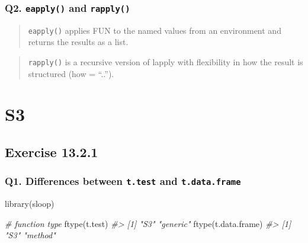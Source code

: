 \documentclass[
]{book}
\newenvironment{Shaded}{\begin{snugshade}}{\end{snugshade}}
\newcommand{\CommentTok}[1]{\textcolor[rgb]{0.56,0.35,0.01}{\textit{#1}}}
\newcommand{\FunctionTok}[1]{\textcolor[rgb]{0.00,0.00,0.00}{#1}}
\newcommand{\NormalTok}[1]{#1}
\begin{document}
\hypertarget{q2.-eapply-and-rapply}{%
\subsection*{\texorpdfstring{Q2. \texttt{eapply()} and \texttt{rapply()}}{Q2. eapply() and rapply()}}\label{q2.-eapply-and-rapply}}

\begin{quote}
\texttt{eapply()} applies FUN to the named values from an environment and returns the results as a list.
\end{quote}

\begin{quote}
\texttt{rapply()} is a recursive version of lapply with flexibility in how the result is structured (how = ``..'').
\end{quote}

\hypertarget{s3}{%
\chapter{S3}\label{s3}}

\hypertarget{exercise-13.2.1}{%
\section{Exercise 13.2.1}\label{exercise-13.2.1}}

\hypertarget{q1.-differences-between-t.test-and-t.data.frame}{%
\subsection*{\texorpdfstring{Q1. Differences between \texttt{t.test} and \texttt{t.data.frame}}{Q1. Differences between t.test and t.data.frame}}\label{q1.-differences-between-t.test-and-t.data.frame}}

\begin{Shaded}
\begin{Highlighting}[]
\FunctionTok{library}\NormalTok{(sloop)}

\CommentTok{\# function type}
\FunctionTok{ftype}\NormalTok{(t.test)}
\CommentTok{\#\textgreater{} [1] "S3"      "generic"}
\FunctionTok{ftype}\NormalTok{(t.data.frame)}
\CommentTok{\#\textgreater{} [1] "S3"     "method"}
\end{Highlighting}
\end{Shaded}
\end{document}
